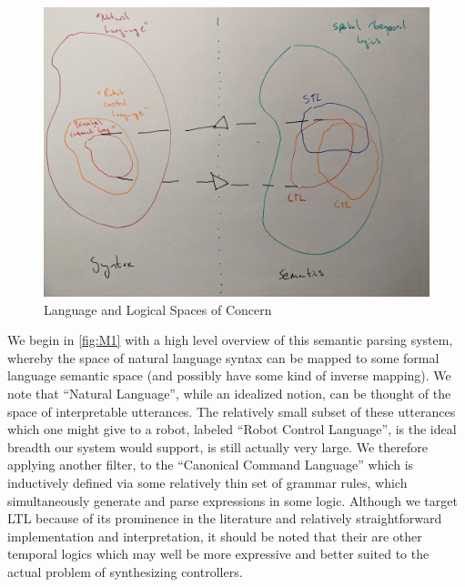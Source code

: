 \documentclass[a4paper, 11pt]{article}
\begin{document}
\begin{figure}[H]
\centering
\includegraphics[width=150mm]{pics/one.jpg}
\caption{Language and Logical Spaces of Concern} \label{fig:M1}
\end{figure}

We begin in \autoref{fig:M1} with a high level overview of this semantic parsing
system, whereby the space of natural language syntax can be mapped to some
formal language semantic space (and possibly have some kind of inverse mapping).
We note that ``Natural Language'', while an idealized notion, can be thought of
the space of interpretable utterances. The relatively small subset of these
utterances which one might give to a robot, labeled ``Robot Control Language'',
is the ideal breadth our system would support, is still actually very large. We
therefore applying another filter, to the ``Canonical Command Language'' which
is inductively defined via some relatively thin set of grammar rules, which
simultaneously generate and parse expressions in some logic. Although we target
LTL because of its prominence in the literature and relatively straightforward
implementation and interpretation, it should be noted that their are other
temporal logics which may well be more expressive and better suited to the
actual problem of synthesizing controllers.
\end{document}
